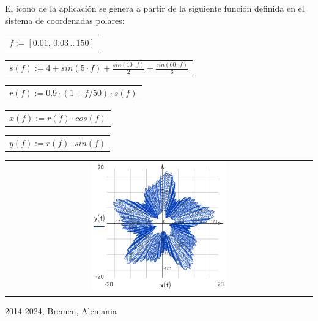 \documentclass[DIV=calc, paper=a4, fontsize=11pt, twocolumn]{scrartcl}
\begin{document}
El icono de la aplicación se genera a
partir de la siguiente función
definida en el sistema de coordenadas
polares:
\begin{center}\begin{tabular}{c}
                $f := \left[ 0.01,\, 0.03 \,..\, 150 \right]$
\end{tabular}\end{center}
\begin{center}\begin{tabular}{c}
                $s(f) := 4 + sin \left( 5 \cdot f\right)  + \frac{sin \left( 10 \cdot f\right) }{2} + \frac{sin \left( 60 \cdot f\right) }{6}$
\end{tabular}\end{center}
\begin{center}\begin{tabular}{c}
                $r(f) := 0.9 \cdot \left( 1 + f / 50 \right) \cdot s \left( f\right) $
\end{tabular}\end{center}
\begin{center}\begin{tabular}{c}
                $x(f) := r \left( f\right)  \cdot cos \left( f\right) $
\end{tabular}\end{center}
\begin{center}\begin{tabular}{c}
                $y(f) := r \left( f\right)  \cdot sin \left( f\right) $
\end{tabular}\end{center}
\begin{center}\begin{tabular}{c} \includegraphics[width=0.45\textwidth]{graphics/about_micromath_fig1.png} \end{tabular}\end{center}

2014-2024, Bremen, Alemania
\end{document}
